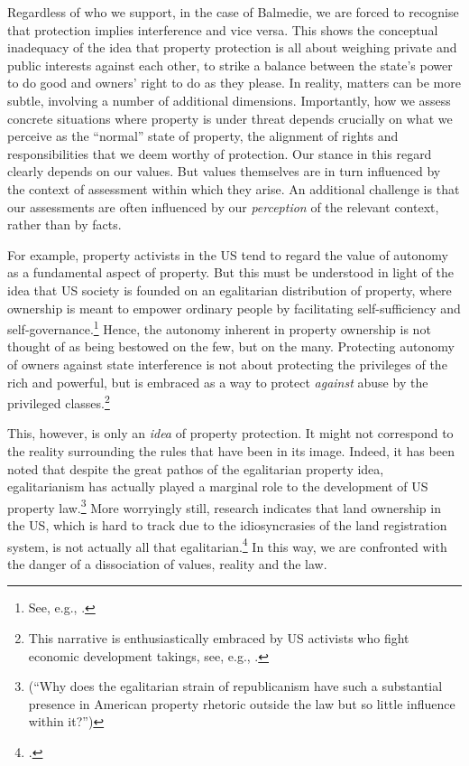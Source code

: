 Regardless of who we support, in the case of Balmedie, we are forced to recognise that protection implies interference and vice versa. This shows the conceptual inadequacy of the idea that property protection is all about weighing private and public interests against each other, to strike a balance between the state's power to do good and owners' right to do as they please. In reality, matters can be more subtle, involving a number of additional dimensions. Importantly, how we assess concrete situations where property is under threat depends crucially on what we perceive as the ``normal'' state of property, the alignment of rights and responsibilities that we deem  worthy of protection. Our stance in this regard clearly depends on our values. But values themselves are in turn influenced by the context of assessment within which they arise. An additional challenge is that our assessments are often influenced by our \emph{perception} of the relevant context, rather than by facts.

For example, property activists in the US tend to regard the value of autonomy as a fundamental aspect of property. But this must be understood in light of the idea that US society is founded on an egalitarian distribution of property, where ownership is meant to empower ordinary people by facilitating self-sufficiency and self-governance.\footnote{See, e.g., \cite[173]{ely07}.} Hence, the autonomy inherent in property ownership is not thought of as being bestowed on the few, but on the many. Protecting autonomy of owners against state interference is not about protecting the privileges of the rich and powerful, but is embraced as a way to protect {\it against} abuse by the privileged classes.\footnote{This narrative is enthusiastically embraced by US activists who fight economic development takings, see, e.g., \cite{castle15}.} 

This, however, is only an {\it idea} of property protection. It might not correspond to the reality surrounding the rules that have been  in its image. Indeed, it has been noted that despite the great pathos of the egalitarian property idea, egalitarianism has actually played a marginal role to the development of US property law.\footnote{\cite[361]{williams98} (``Why does the egalitarian strain of republicanism have such a substantial presence in American property rhetoric outside the law but so little influence within it?'')} More worryingly still, research indicates that land ownership in the US, which is hard to track due to the idiosyncrasies of the land registration system, is not actually all that egalitarian.\footcite[246-247]{jacobs98} In this way, we are confronted with the danger of a dissociation of values, reality and the law.

